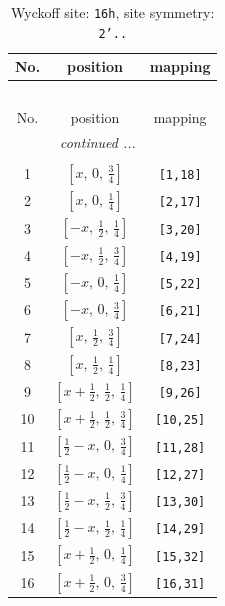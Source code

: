 \documentclass[fleqn,8pt]{jsarticle}
\begin{document}
\begin{longtable}{ccc}
\caption{Wyckoff site: {\tt 16h}, site symmetry: {\tt 2'..}}
 \\
 \hline \hline
No. & position & mapping \\ \hline \endfirsthead

\multicolumn{2}{l}{\tablename\ \thetable{}} \\
 \hline \hline
No. & position & mapping \\ \hline \endhead

 \hline \hline
\multicolumn{2}{r}{\footnotesize\it continued ...} \\ \endfoot

 \hline \hline
\multicolumn{2}{r}{} \\ \endlastfoot

1 & $\left[ x,\, 0,\, \frac{3}{4} \right]$ & {\tt [1,18]} \\ \hline
2 & $\left[ x,\, 0,\, \frac{1}{4} \right]$ & {\tt [2,17]} \\ \hline
3 & $\left[ - x,\, \frac{1}{2},\, \frac{1}{4} \right]$ & {\tt [3,20]} \\ \hline
4 & $\left[ - x,\, \frac{1}{2},\, \frac{3}{4} \right]$ & {\tt [4,19]} \\ \hline
5 & $\left[ - x,\, 0,\, \frac{1}{4} \right]$ & {\tt [5,22]} \\ \hline
6 & $\left[ - x,\, 0,\, \frac{3}{4} \right]$ & {\tt [6,21]} \\ \hline
7 & $\left[ x,\, \frac{1}{2},\, \frac{3}{4} \right]$ & {\tt [7,24]} \\ \hline
8 & $\left[ x,\, \frac{1}{2},\, \frac{1}{4} \right]$ & {\tt [8,23]} \\ \hline
9 & $\left[ x + \frac{1}{2},\, \frac{1}{2},\, \frac{1}{4} \right]$ & {\tt [9,26]} \\ \hline
10 & $\left[ x + \frac{1}{2},\, \frac{1}{2},\, \frac{3}{4} \right]$ & {\tt [10,25]} \\ \hline
11 & $\left[ \frac{1}{2} - x,\, 0,\, \frac{3}{4} \right]$ & {\tt [11,28]} \\ \hline
12 & $\left[ \frac{1}{2} - x,\, 0,\, \frac{1}{4} \right]$ & {\tt [12,27]} \\ \hline
13 & $\left[ \frac{1}{2} - x,\, \frac{1}{2},\, \frac{3}{4} \right]$ & {\tt [13,30]} \\ \hline
14 & $\left[ \frac{1}{2} - x,\, \frac{1}{2},\, \frac{1}{4} \right]$ & {\tt [14,29]} \\ \hline
15 & $\left[ x + \frac{1}{2},\, 0,\, \frac{1}{4} \right]$ & {\tt [15,32]} \\ \hline
16 & $\left[ x + \frac{1}{2},\, 0,\, \frac{3}{4} \right]$ & {\tt [16,31]} \\
\end{longtable}
\end{document}
